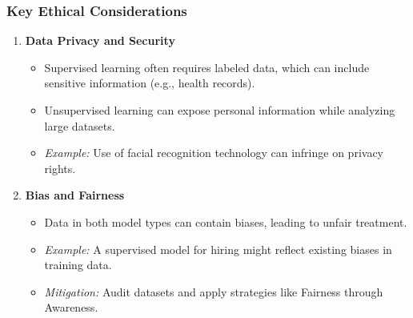 \documentclass[aspectratio=169]{beamer}
\begin{document}
\begin{frame}[fragile]
    \frametitle{Key Ethical Considerations}
    \begin{enumerate}
        \item \textbf{Data Privacy and Security}
            \begin{itemize}
                \item Supervised learning often requires labeled data, which can include sensitive information (e.g., health records).
                \item Unsupervised learning can expose personal information while analyzing large datasets.
                \item \textit{Example:} Use of facial recognition technology can infringe on privacy rights.
            \end{itemize}
        \item \textbf{Bias and Fairness}
            \begin{itemize}
                \item Data in both model types can contain biases, leading to unfair treatment.
                \item \textit{Example:} A supervised model for hiring might reflect existing biases in training data.
                \item \textit{Mitigation:} Audit datasets and apply strategies like Fairness through Awareness.
            \end{itemize}
    \end{enumerate}
\end{frame}
\end{document}
